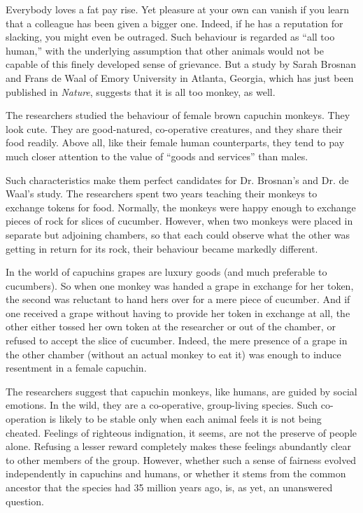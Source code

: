 \documentclass[UTF8,11pt]{ctexart}
\begin{document}
Everybody loves a fat pay rise. Yet pleasure at your own can vanish if you learn that a colleague has been given a bigger one. Indeed, if he has a reputation for slacking, you might even be outraged. Such behaviour is regarded as “all too human,” with the underlying assumption that other animals would not be capable of this finely developed sense of grievance. But a study by Sarah Brosnan and Frans de Waal of Emory University in Atlanta, Georgia, which has just been published in \textit{Nature}, suggests that it is all too monkey, as well.


The researchers studied the behaviour of female brown capuchin monkeys. They look cute. They are good-natured, co-operative creatures, and they share their food readily. Above all, like their female human counterparts, they tend to pay much closer attention to the value of “goods and services” than males.


Such characteristics make them perfect candidates for Dr. Brosnan’s and Dr. de Waal’s study. The researchers spent two years teaching their monkeys to exchange tokens for food. Normally, the monkeys were happy enough to exchange pieces of rock for slices of cucumber. However, when two monkeys were placed in separate but adjoining chambers, so that each could observe what the other was getting in return for its rock, their behaviour became markedly different.


In the world of capuchins grapes are luxury goods (and much preferable to cucumbers). So when one monkey was handed a grape in exchange for her token, the second was reluctant to hand hers over for a mere piece of cucumber. And if one received a grape without having to provide her token in exchange at all, the other either tossed her own token at the researcher or out of the chamber, or refused to accept the slice of cucumber. Indeed, the mere presence of a grape in the other chamber (without an actual monkey to eat it) was enough to induce resentment in a female capuchin.


The researchers suggest that capuchin monkeys, like humans, are guided by social emotions. In the wild, they are a co-operative, group-living species. Such co-operation is likely to be stable only when each animal feels it is not being cheated. Feelings of righteous indignation, it seems, are not the preserve of people alone. Refusing a lesser reward completely makes these feelings abundantly clear to other members of the group. However, whether such a sense of fairness evolved independently in capuchins and humans, or whether it stems from the common ancestor that the species had 35 million years ago, is, as yet, an unanswered question.
\end{document}
